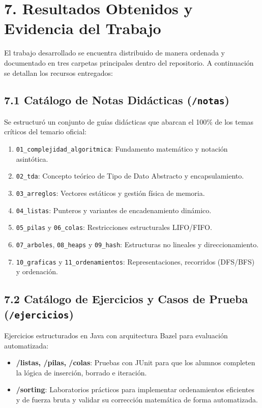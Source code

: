 \documentclass[12 pt]{article}
\begin{document}
\section*{7. Resultados Obtenidos y Evidencia del Trabajo}

El trabajo desarrollado se encuentra distribuido de manera ordenada y documentado en tres carpetas principales dentro del repositorio. A continuación se detallan los recursos entregados:

\subsection*{7.1 Catálogo de Notas Didácticas (\texttt{/notas})}
Se estructuró un conjunto de guías didácticas que abarcan el 100\% de los temas críticos del temario oficial:
\begin{enumerate}
    \item \texttt{01\_complejidad\_algoritmica}: Fundamento matemático y notación asintótica.
    \item \texttt{02\_tda}: Concepto teórico de Tipo de Dato Abstracto y encapsulamiento.
    \item \texttt{03\_arreglos}: Vectores estáticos y gestión física de memoria.
    \item \texttt{04\_listas}: Punteros y variantes de encadenamiento dinámico.
    \item \texttt{05\_pilas} y \texttt{06\_colas}: Restricciones estructurales LIFO/FIFO.
    \item \texttt{07\_arboles}, \texttt{08\_heaps} y \texttt{09\_hash}: Estructuras no lineales y direccionamiento.
    \item \texttt{10\_graficas} y \texttt{11\_ordenamientos}: Representaciones, recorridos (DFS/BFS) y ordenación.
\end{enumerate}

\subsection*{7.2 Catálogo de Ejercicios y Casos de Prueba (\texttt{/ejercicios})}
Ejercicios estructurados en Java con arquitectura Bazel para evaluación automatizada:
\begin{itemize}
    \item \textbf{/listas, /pilas, /colas}: Pruebas con JUnit para que los alumnos completen la lógica de inserción, borrado e iteración.
    \item \textbf{/sorting}: Laboratorios prácticos para implementar ordenamientos eficientes y de fuerza bruta y validar su corrección matemática de forma automatizada.
\end{itemize}
\end{document}
